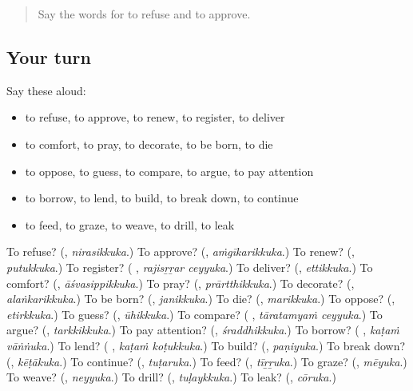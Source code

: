 \label{lesson:ML-R272-second-pass-words-from-chapters-268-272}



\begin{quote}
Say the words for to refuse and to approve.
\end{quote}

\subsection*{Your turn}
Say these aloud:

\begin{itemize}
\raggedright
  \item to refuse, to approve, to renew, to register, to deliver
  \item to comfort, to pray, to decorate, to be born, to die
  \item to oppose, to guess, to compare, to argue, to pay attention
  \item to borrow, to lend, to build, to break down, to continue
  \item to feed, to graze, to weave, to drill, to leak
\end{itemize}

\begin{tcolorbox}[breakable,colback=teal!4,colframe=teal!35!black,title={Before you move on}]
To refuse? (\textbf{}, \emph{nirasikkuka}.) To approve? (\textbf{}, \emph{aṁgīkarikkuka}.) To renew? (\textbf{}, \emph{putukkuka}.) To register? (\textbf{ }, \emph{rajisṟṟar ceyyuka}.) To deliver? (\textbf{}, \emph{ettikkuka}.) To comfort? (\textbf{}, \emph{āśvasippikkuka}.) To pray? (\textbf{}, \emph{prārtthikkuka}.) To decorate? (\textbf{}, \emph{alaṅkarikkuka}.) To be born? (\textbf{}, \emph{janikkuka}.) To die? (\textbf{}, \emph{marikkuka}.) To oppose? (\textbf{}, \emph{etirkkuka}.) To guess? (\textbf{}, \emph{ūhikkuka}.) To compare? (\textbf{ }, \emph{tāratamyaṁ ceyyuka}.) To argue? (\textbf{}, \emph{tarkkikkuka}.) To pay attention? (\textbf{}, \emph{śraddhikkuka}.) To borrow? (\textbf{ }, \emph{kaṭaṁ vāṅṅuka}.) To lend? (\textbf{ }, \emph{kaṭaṁ koṭukkuka}.) To build? (\textbf{}, \emph{paṇiyuka}.) To break down? (\textbf{}, \emph{kēṭākuka}.) To continue? (\textbf{}, \emph{tuṭaruka}.) To feed? (\textbf{}, \emph{tīṟṟuka}.) To graze? (\textbf{}, \emph{mēyuka}.) To weave? (\textbf{}, \emph{neyyuka}.) To drill? (\textbf{}, \emph{tuḷaykkuka}.) To leak? (\textbf{}, \emph{cōruka}.)
\end{tcolorbox}
